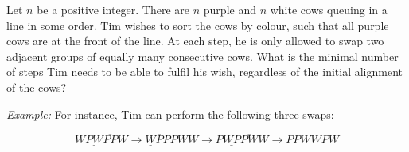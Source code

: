 Let $n$ be a positive integer.
There are $n$ purple and $n$ white cows queuing in a line in some order.
Tim wishes to sort the cows by colour, such that all purple cows are at the front of the line.
At each step, he is only allowed to swap two adjacent groups of equally many consecutive cows.
What is the minimal number of steps Tim needs to be able to fulfil his wish, regardless of the initial alignment of the cows?

\emph{Example:} For instance, Tim can perform the following three swaps:

$$
    W\underline{PW}\overline{PP}W \longrightarrow
    \underline{W}\overline{P}PPWW \longrightarrow
    P\underline{WP}\overline{PW}W \longrightarrow
    PPWWPW
$$

